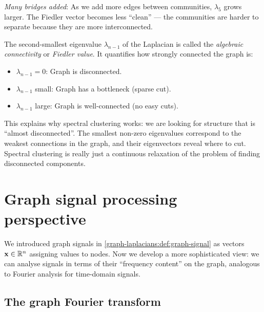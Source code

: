 \begin{notechapter}
\begin{intuition}
\emph{Many bridges added}: As we add more edges between communities, $\lambda_5$ grows larger. The Fiedler vector becomes less ``clean'' --- the communities are harder to separate because they are more interconnected.
\end{intuition}

\begin{definition}\label{graph-laplacians:def:algebraic-connectivity}
The second-smallest eigenvalue $\lambda_{n-1}$ of the Laplacian is called the \emph{algebraic connectivity} or \emph{Fiedler value}. It quantifies how strongly connected the graph is:
\begin{itemize}
    \item $\lambda_{n-1} = 0$: Graph is disconnected.
    \item $\lambda_{n-1}$ small: Graph has a bottleneck (sparse cut).
    \item $\lambda_{n-1}$ large: Graph is well-connected (no easy cuts).
\end{itemize}
\end{definition}

\begin{remark}
This explains why spectral clustering works: we are looking for structure that is ``almost disconnected''. The smallest non-zero eigenvalues correspond to the weakest connections in the graph, and their eigenvectors reveal where to cut. Spectral clustering is really just a continuous relaxation of the problem of finding disconnected components.
\end{remark}

\section{Graph signal processing perspective}

We introduced graph signals in \cref{graph-laplacians:def:graph-signal} as vectors $\mathbf{x} \in \mathbb{R}^n$ assigning values to nodes. Now we develop a more sophisticated view: we can analyse signals in terms of their ``frequency content'' on the graph, analogous to Fourier analysis for time-domain signals.

\subsection{The graph Fourier transform}


\end{notechapter}
